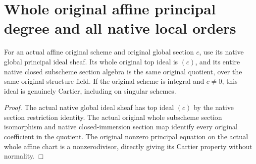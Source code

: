 \section{Whole original affine principal degree and all native local orders}

\begin{definition}
\label{def:fc-affine-principal-original-quotient}
\leanok
{}
For an actual affine original scheme and original global section $c$, use
its native global principal ideal sheaf.  Its whole original top ideal is
$(c)$, and its entire native closed subscheme section algebra is the same
original quotient, over the same original structure field.  If the original
scheme is integral and $c\ne0$, this ideal is genuinely Cartier, including
on singular schemes.
\end{definition}
\begin{proof}
The actual native global ideal sheaf has top ideal $(c)$ by the native
section restriction identity.  The actual original whole subscheme section
isomorphism and native closed-immersion section map identify every original
coefficient in the quotient.  The original nonzero principal equation on
the actual whole affine chart is a nonzerodivisor, directly giving its
Cartier property without normality.
\end{proof}

